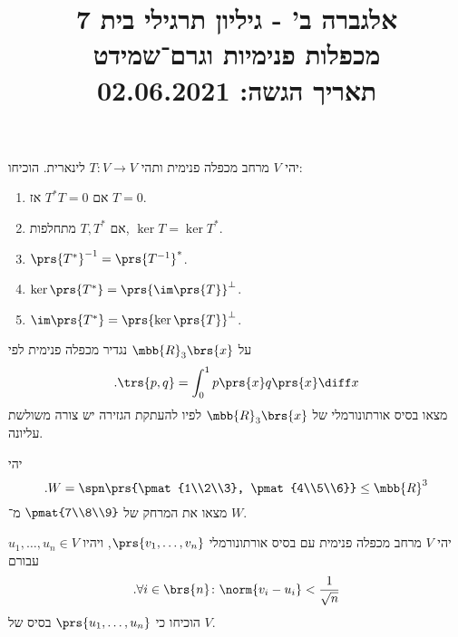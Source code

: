 \documentclass[a4paper,10pt,twoside,openany]{article}
\title{
אלגברה ב' - גיליון תרגילי בית 7 \\
מכפלות פנימיות וגרם־שמידט
\\
\small{תאריך הגשה: 02.06.2021}
}
\date{}
\begin{document}
\maketitle

\begin{exercise}%
יהי
$V$
מרחב מכפלה פנימית ותהי
$T \colon V \to V$
לינארית. הוכיחו:
\begin{enumerate}
\item אם
$T^* T = 0$
אז
$T = 0$.
\item אם
$T, T^*$
מתחלפות,
$\ker T = \ker T^*$.
\item $\prs{T^*}^{-1} = \prs{T^{-1}}^*$.
\item $\ker \prs{T^*} = \prs{\im\prs{T}}^\perp$.
\item $\im \prs{T^*} = \prs{\ker\prs{T}}^\perp$.
\end{enumerate}
\end{exercise}

\begin{exercise}
על
$\mbb{R}_3\brs{x}$
נגדיר מכפלה פנימית לפי
\[\text{.} \trs{p,q} = \int_0^1 p\prs{x} q\prs{x} \diff x\]
מצאו בסיס אורתונורמלי של
$\mbb{R}_3\brs{x}$
לפיו להעתקת הגזירה יש צורה משולשת עליונה.
\end{exercise}

\begin{exercise}%
יהי
\[\text{.} W = \spn\prs{\pmat{1\\2\\3}, \pmat{4\\5\\6}} \leq \mbb{R}^3\]
מצאו את המרחק של
$\pmat{7\\8\\9}$
מ־%
$W$.
\end{exercise}

\begin{exercise}
יהי
$V$
מרחב מכפלה פנימית עם בסיס אורתונורמלי
$\prs{v_1, \ldots, v_n}$,
ויהיו
$u_1, \ldots, u_n \in V$
עבורם
\[\text{.} \forall i \in \brs{n} \colon \norm{v_i - u_i} < \frac{1}{\sqrt{n}}\]
הוכיחו כי
$\prs{u_1, \ldots, u_n}$
בסיס של
$V$.
\end{exercise}
\end{document}

